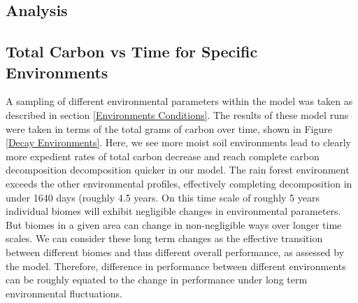 \documentclass[12pt]{article}
\begin{document}
\begin{multicols}{2}


\section{Analysis}


\subsection{Total Carbon vs Time for Specific Environments} %
A sampling of different environmental parameters within the model was taken as described in section \ref{Environments Conditions}. The results of these model runs were taken in terms of the total grams of carbon over time, shown in Figure \ref{Decay Environments}. Here, we see more moist soil environments lead to clearly more expedient rates of total carbon decrease and reach complete carbon decomposition decomposition quicker in our model. The rain forest environment exceeds the other environmental profiles, effectively completing decomposition in under 1640 days (roughly 4.5 years. On this time scale of roughly 5 years individual biomes will exhibit negligible changes in environmental parameters. But biomes in a given area can change in non-negligible ways over longer time scales. We can consider these long term changes as the effective transition between different biomes and thus different overall performance, as assessed by the model. Therefore, difference in performance between different environments can be roughly equated to the change in performance under long term environmental fluctuations. 

\end{multicols}
\end{document}
